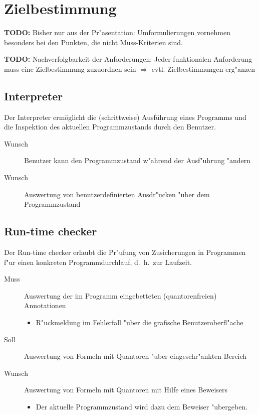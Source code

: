 \section{Zielbestimmung}%

\textbf{TODO:} Bisher nur aus der Pr"asentation: Umformulierungen vornehmen besonders bei den Punkten, die nicht Muss-Kriterien sind.%

\textbf{TODO:} Nachverfolgbarkeit der Anforderungen: Jeder funktionalen Anforderung muss eine Zielbestimmung zuzuordnen sein $\Rightarrow$ evtl. Zielbestimmungen erg"anzen%

\subsection{Interpreter}%

Der \see Interpreter ermöglicht die (schrittweise) Ausführung eines \see Programms und die Inspektion des aktuellen \see Programmzustands durch den Benutzer.%

\begin{description}%
    \item[Wunsch] Benutzer kann den Programmzustand w"ahrend der Ausf"uhrung "andern%
    \item[Wunsch] Auswertung von benutzerdefinierten \see Ausdr"ucken "uber dem Programmzustand%
\end{description}%

\subsection{Run-time checker}%

Der \see Run-time checker erlaubt die Pr"ufung von \see Zusicherungen in Programmen f"ur einen konkreten Programmdurchlauf, d.~h.\ zur Laufzeit.%

\begin{description}%
    \item [Muss] Auswertung der im Programm eingebetteten (quantorenfreien) \see Annotationen%
        \begin{itemize}%
            \item R"uckmeldung im Fehlerfall "uber die grafische Benutzeroberfl"ache%
        \end{itemize}%
    \item [Soll] Auswertung von Formeln mit \see Quantoren "uber eingeschr"ankten Bereich%
    \item [Wunsch] Auswertung von Formeln mit Quantoren mit Hilfe eines \see Beweisers%
        \begin{itemize}%
            \item Der aktuelle Programmzustand wird dazu dem Beweiser "ubergeben.%
        \end{itemize}%
\end{description}%

